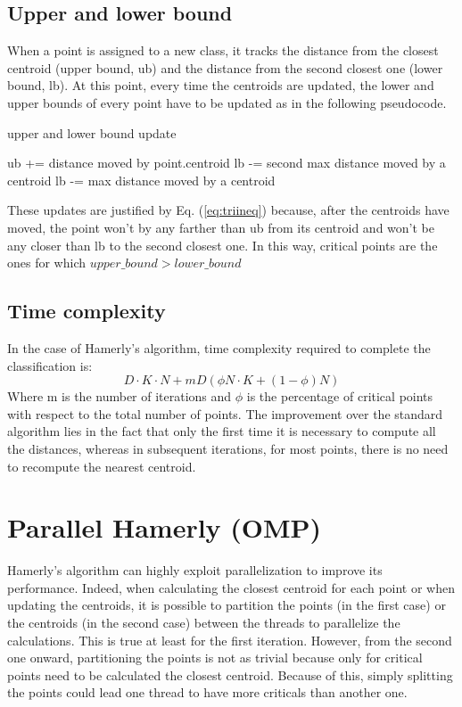 \documentclass[conference]{IEEEtran}
\begin{document}
\subsection{Upper and lower bound}
When a point is assigned to a new class, it tracks the distance from the closest centroid (upper bound, ub) and the distance from the second closest one (lower bound, lb). At this point, every time the centroids are updated, the lower and upper bounds of every point have to be updated as in the following pseudocode.

\begin{algorithm}[H]
    \caption{upper and lower bound update}
    \begin{algorithmic}
    \State ub += distance moved by point.centroid
        \State lb -= second max distance moved by a centroid
    \Else
        \State lb -= max distance moved by a centroid
    \EndIf
    \end{algorithmic}
\end{algorithm}

These updates are justified by Eq. (\ref{eq:triineq}) because, after the centroids have moved, the point won't by any farther than ub from its centroid and won't be any closer than lb to the second closest one. In this way, critical points are the ones for which $upper\_bound > lower\_bound$

\subsection{Time complexity}
In the case of Hamerly's algorithm, time complexity required to complete the classification is:
\begin{equation}
    D\cdot K\cdot N + mD(\phi N\cdot K + (1 - \phi)N)
    \label{eq:hamcomp}
\end{equation}
Where m is the number of iterations and $\phi$ is the percentage of critical points with respect to the total number of points.
The improvement over the standard algorithm lies in the fact that only the first time it is necessary to compute all the distances, whereas in subsequent iterations, for most points, there is no need to recompute the nearest centroid.

\section{Parallel Hamerly (OMP)}
Hamerly's algorithm can highly exploit parallelization to improve its performance. Indeed, when calculating the closest centroid for each point or when updating the centroids, it is possible to partition the points (in the first case) or the centroids (in the second case) between the threads to parallelize the calculations.
This is true at least for the first iteration. However, from the second one onward, partitioning the points is not as trivial because only for critical points need to be calculated the closest centroid. Because of this, simply splitting the points could lead one thread to have more criticals than another one.
\end{document}
